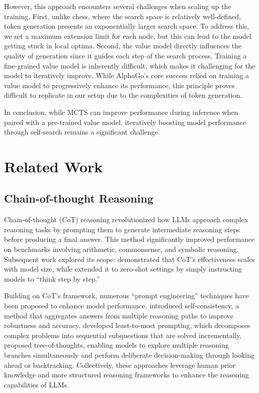 However, this approach encounters several challenges when scaling up the training. First, unlike chess, where the search space is relatively well-defined, token generation presents an exponentially larger search space. To address this, we set a maximum extension limit for each node, but this can lead to the model getting stuck in local optima. Second, the value model directly influences the quality of generation since it guides each step of the search process. Training a fine-grained value model is inherently difficult, which makes it challenging for the model to iteratively improve. While AlphaGo's core success relied on training a value model to progressively enhance its performance, this principle proves difficult to replicate in our setup due to the complexities of token generation.

In conclusion, while MCTS can improve performance during inference when paired with a pre-trained value model, iteratively boosting model performance through self-search remains a significant challenge.


\section{Related Work}

\subsection{Chain-of-thought Reasoning}
Chain-of-thought (CoT) reasoning \citep{wei2022chain} revolutionized how LLMs approach complex reasoning tasks by prompting them to generate intermediate reasoning steps before producing a final answer.
% 
This method significantly improved performance on benchmarks involving arithmetic, commonsense, and symbolic reasoning. Subsequent work explored its scope: \citet{suzgun-etal-2023-challenging} demonstrated that CoT's effectiveness scales with model size, while \citet{kojima2022large} extended it to zero-shot settings by simply instructing models to ``think step by step.''

Building on CoT's framework, numerous ``prompt engineering'' techniques have been proposed to enhance model performance.
\citet{wang2022self} introduced self-consistency, a method that aggregates answers from multiple reasoning paths to improve robustness and accuracy.
\citet{zhou2023leasttomost} developed least-to-most prompting, which decomposes complex problems into sequential subquestions that are solved incrementally. 
\citet{yao2023tree} proposed tree-of-thoughts, enabling models to explore multiple reasoning branches simultaneously and perform deliberate decision-making through looking ahead or backtracking.
Collectively, these approaches leverage human prior knowledge and more structured reasoning frameworks to enhance the reasoning capabilities of LLMs.


